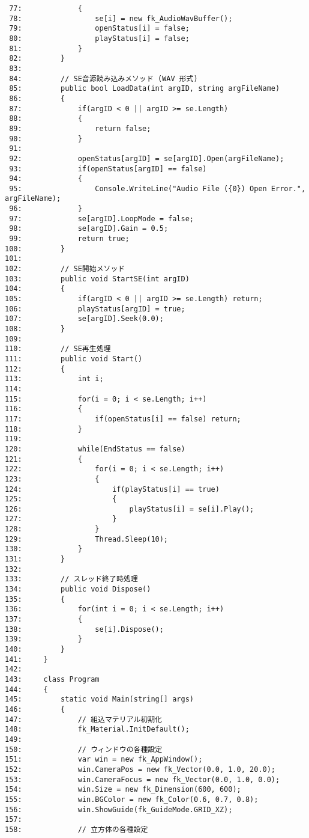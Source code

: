 \begin{breakbox}
\begin{small}
\begin{verbatim}
 77:             {
 78:                 se[i] = new fk_AudioWavBuffer();
 79:                 openStatus[i] = false;
 80:                 playStatus[i] = false;
 81:             }
 82:         }
 83: 
 84:         // SE音源読み込みメソッド (WAV 形式)
 85:         public bool LoadData(int argID, string argFileName)
 86:         {
 87:             if(argID < 0 || argID >= se.Length)
 88:             {
 89:                 return false;
 90:             }
 91: 
 92:             openStatus[argID] = se[argID].Open(argFileName);
 93:             if(openStatus[argID] == false)
 94:             {
 95:                 Console.WriteLine("Audio File ({0}) Open Error.", argFileName);
 96:             }
 97:             se[argID].LoopMode = false;
 98:             se[argID].Gain = 0.5;
 99:             return true;
100:         }
101: 
102:         // SE開始メソッド
103:         public void StartSE(int argID)
104:         {
105:             if(argID < 0 || argID >= se.Length) return;
106:             playStatus[argID] = true;
107:             se[argID].Seek(0.0);
108:         }
109: 
110:         // SE再生処理
111:         public void Start()
112:         {
113:             int i;
114: 
115:             for(i = 0; i < se.Length; i++)
116:             {
117:                 if(openStatus[i] == false) return;
118:             }
119: 
120:             while(EndStatus == false)
121:             {
122:                 for(i = 0; i < se.Length; i++)
123:                 {
124:                     if(playStatus[i] == true)
125:                     {
126:                         playStatus[i] = se[i].Play();
127:                     }
128:                 }
129:                 Thread.Sleep(10);
130:             }
131:         }
132: 
133:         // スレッド終了時処理
134:         public void Dispose()
135:         {
136:             for(int i = 0; i < se.Length; i++)
137:             {
138:                 se[i].Dispose();
139:             }
140:         }
141:     }
142: 
143:     class Program
144:     {
145:         static void Main(string[] args)
146:         {
147:             // 組込マテリアル初期化
148:             fk_Material.InitDefault();          
149: 
150:             // ウィンドウの各種設定
151:             var win = new fk_AppWindow();
152:             win.CameraPos = new fk_Vector(0.0, 1.0, 20.0);
153:             win.CameraFocus = new fk_Vector(0.0, 1.0, 0.0);
154:             win.Size = new fk_Dimension(600, 600);
155:             win.BGColor = new fk_Color(0.6, 0.7, 0.8);
156:             win.ShowGuide(fk_GuideMode.GRID_XZ);
157: 
158:             // 立方体の各種設定

\end{verbatim}
\end{small}
\end{breakbox}
